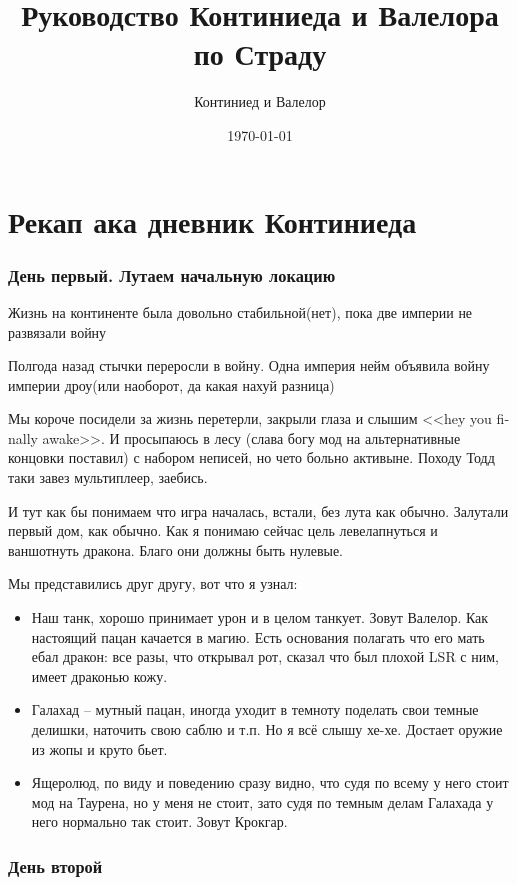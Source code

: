 \documentclass[letterpaper,twocolumn,openany,nodeprecatedcode]{dndbook}
\title{Руководство Континиеда и Валелора по Страду}
\author{Континиед и Валелор}
\date{\today}
\begin{document}
\maketitle

\tableofcontents

\large

\part{Рекап ака дневник Континиеда}
\section{День первый. Лутаем начальную локацию}

Жизнь на континенте была довольно стабильной(нет), пока две империи не развязали войну

Полгода назад стычки переросли в войну. Одна империя нейм объявила войну империи дроу(или наоборот, да какая нахуй разница)

Мы короче посидели за жизнь перетерли, закрыли глаза и слышим <<\textenglish{hey you finally awake}>>. И просыпаюсь в лесу
(слава богу мод на альтернативные концовки поставил) с набором неписей, но чето больно активыне. Походу Тодд таки завез мультиплеер, заебись.

И тут как бы понимаем что игра началась,
встали, без лута как обычно. Залутали первый дом, как обычно. Как я понимаю сейчас цель левелапнуться и ваншотнуть дракона. Благо они должны быть нулевые.

Мы представились друг другу, вот что я узнал:

\begin{itemize}
    \item Наш танк, хорошо принимает урон и в целом танкует. Зовут Валелор. Как настоящий пацан качается в магию. 
    Есть основания полагать что его мать ебал дракон: все разы, что открывал рот, сказал что был плохой LSR с ним, имеет драконью кожу.
    \item Галахад -- мутный пацан, иногда уходит в темноту поделать свои темные делишки, наточить свою саблю и т.п. Но я всё слышу хе-хе.
    Достает оружие из жопы и круто бьет.
    \item Ящеролюд, по виду и поведению сразу видно, что судя по всему у него стоит мод на Таурена, но у меня не стоит, 
    зато судя по темным делам Галахада у него нормально так стоит. Зовут Крокгар.
\end{itemize}

\section{День второй}
\end{document}
